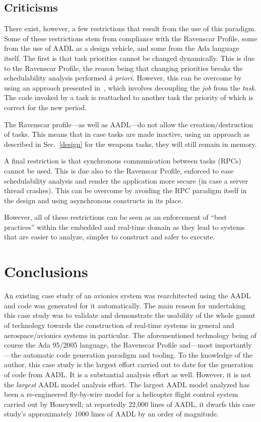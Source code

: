 \subsection{Criticisms}
There exist, however, a few restrictions that result from the use of
this paradigm. Some of these restrictions stem from compliance with
the Ravenscar Profile, some from the use of AADL as a design vehicle,
and some from the Ada language itself. The first is that task
priorities cannot be changed dynamically. This is due to the Ravenscar
Profile, the reason being that changing priorities breaks the
schedulability analysis performed \emph{\`a priori}. However, this can
be overcome by using an approach presented in~\cite{puente@adalett01},
which involves decoupling the \emph{job} from the \emph{task}. The
code invoked by a task is reattached to another task the priority of
which is correct for the new period.

The Ravenscar profile---as well as AADL---do not allow the
creation/destruction of tasks. This means that in case tasks are made
inactive, using an approach as described in Sec.~\ref{design} for the
weapons tasks, they will still remain in memory.

A final restriction is that synchronous communication between tasks
(RPCs) cannot be used. This is due also to the Ravenscar Profile,
enforced to ease schedulability analysis and render the application
more secure (in case a server thread crashes). This can be overcome by
avoiding the RPC paradigm itself in the design and using asynchronous
constructs in its place.

However, all of these restrictions can be seen as an enforcement of
``best practices'' within the embedded and real-time domain as they
lead to systems that are easier to analyze, simpler to construct and
safer to execute.

\section{Conclusions}
\label{conclusions}
An existing case study of an avionics system was rearchitected using
the AADL and code was generated for it automatically. The main reason
for undertaking this case study was to validate and demonstrate the
usability of the whole gamut of technology towards the construction of
real-time systems in general and aerospace/avionics systems in
particular. The aforementioned technology being of course the Ada
95/2005 language, the Ravenscar Profile and---most importantly---the
automatic code generation paradigm and tooling. To the knowledge of
the author, this case study is the largest effort carried out to date
for the generation of code from AADL. It is a substantial analysis
effort as well. However, it is not the \emph{largest} AADL model
analysis effort. The largest AADL model analyzed has been a
re-engineered fly-by-wire model for a helicopter flight control system
carried out by Honeywell; at reportedly 22,000 lines of AADL, it
dwarfs this case study's approximately 1000 lines of AADL by an order
of magnitude.

